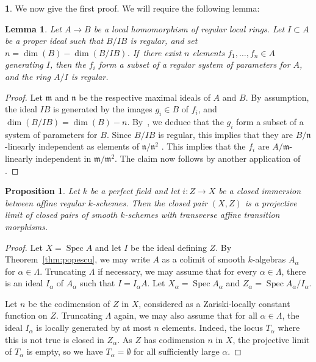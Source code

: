 \documentclass[JEP,XML,SOM,Unicode]{cedram}
\DeclareMathOperator{\spec}{Spec}
\newtheorem{prop}[thm]{Proposition}
\newtheorem{lm}[thm]{Lemma}
\theoremstyle{remark}
\theoremstyle{definition}
\newtheorem{num}[thm]{}
\numberwithin{equation}{thm}
\begin{document}
\begin{num}
We now give the first proof.
We will require the following lemma:

\begin{lm}
\label{lm:local_gen}
Let $A \to B$ be a local homomorphism of regular local rings.
Let $I\subset A$ be a proper ideal such that $B/IB$ is regular, and set $n = \dim(B) - \dim(B/IB)$.
If~there exist $n$ elements $f_1,\ldots,f_n \in A$ generating $I$, then the $f_i$ form a subset of a regular system of parameters for $A$, and the ring $A/I$ is regular.
\end{lm}

\begin{proof}
Let $\mathfrak{m}$ and $\mathfrak{n}$ be the respective maximal ideals of $A$ and $B$.
By assumption, the ideal $IB$ is generated by the images $g_i \in B$ of $f_i$, and \hbox{$\dim(B/IB) = \dim(B) - n$}.
By~\cite[0, Prop.\,16.3.7]{EGA4}, we deduce that the $g_i$ form a subset of a system of parameters for $B$.
Since $B/IB$ is regular, this implies that they are $B/\mathfrak{n}$-linearly independent as elements of $\mathfrak{n}/\mathfrak{n}^2$ \cite[0, Prop.\,17.1.7]{EGA4}.
This implies that the $f_i$ are $A/\mathfrak{m}$-linearly independent in $\mathfrak{m}/\mathfrak{m}^2$.
The claim now follows by another application of \cite[0, Prop.\,17.1.7]{EGA4}.
\end{proof}

\begin{prop}
\label{prop:aff_reg_pur}
Let $k$ be a perfect field and let $i:Z\to X$ be a closed immersion between affine regular $k$-schemes. Then the closed pair $(X,Z)$ is a projective limit of closed pairs of smooth $k$-schemes with transverse affine transition morphisms.
\end{prop}
\begin{proof}
Let $X=\spec A$ and let $I$ be the ideal defining $Z$. By Theorem~\ref{thm:popescu}, we may write $A$ as a colimit of smooth $k$-algebras $A_\alpha$ for $\alpha\in \Lambda$.
Truncating $\Lambda$ if necessary, we may assume that for every $\alpha\in\Lambda$, there is an ideal $I_\alpha$ of $A_\alpha$ such that $I=I_\alpha A$.
Let $X_\alpha=\spec A_\alpha$ and $Z_\alpha=\spec A_\alpha/I_\alpha$.

Let $n$ be the codimension of $Z$ in $X$, considered as a Zariski-locally constant function on $Z$.
Truncating $\Lambda$ again, we may also assume that for all $\alpha\in\Lambda$, the ideal $I_\alpha$ is locally generated by at most $n$ elements. Indeed, the locus $T_\alpha$ where this is not true is closed in $Z_\alpha$. As $Z$ has codimension $n$ in $X$, the projective limit of $T_\alpha$ is empty, so we have $T_\alpha=\emptyset$ for all sufficiently large $\alpha$.


\end{proof}
\end{num}
\end{document}
